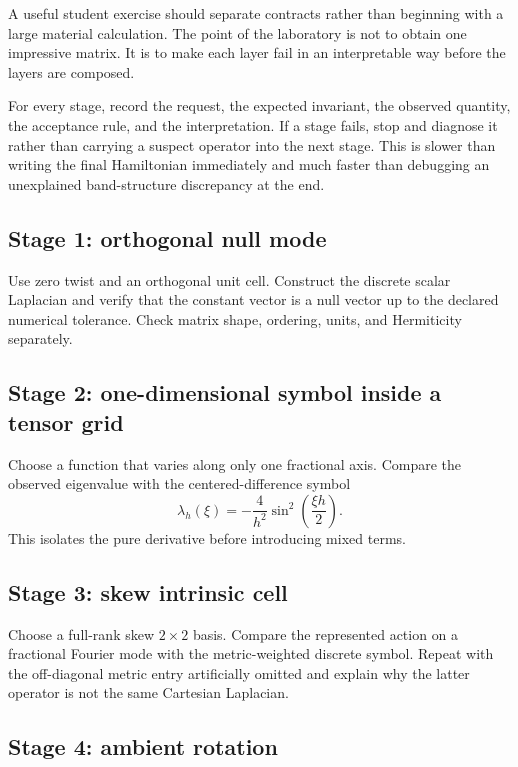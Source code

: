 A useful student exercise should separate contracts rather than beginning with
a large material calculation. The point of the laboratory is not to obtain one
impressive matrix. It is to make each layer fail in an interpretable way before
the layers are composed.

For every stage, record the request, the expected invariant, the observed
quantity, the acceptance rule, and the interpretation. If a stage fails, stop
and diagnose it rather than carrying a suspect operator into the next stage.
This is slower than writing the final Hamiltonian immediately and much faster
than debugging an unexplained band-structure discrepancy at the end.

\subsection{Stage 1: orthogonal null mode}

Use zero twist and an orthogonal unit cell. Construct the discrete scalar
Laplacian and verify that the constant vector is a null vector up to the
declared numerical tolerance. Check matrix shape, ordering, units, and
Hermiticity separately.

\subsection{Stage 2: one-dimensional symbol inside a tensor grid}

Choose a function that varies along only one fractional axis. Compare the
observed eigenvalue with the centered-difference symbol
\begin{equation}
  \lambda_h(\xi)
  =-\frac{4}{h^2}\sin^2\!\left(\frac{\xi h}{2}\right).
  \label{eq:training-centered-symbol}
\end{equation}
This isolates the pure derivative before introducing mixed terms.

\subsection{Stage 3: skew intrinsic cell}

Choose a full-rank skew $2\times2$ basis. Compare the represented action on a
fractional Fourier mode with the metric-weighted discrete symbol. Repeat with
the off-diagonal metric entry artificially omitted and explain why the latter
operator is not the same Cartesian Laplacian.

\subsection{Stage 4: ambient rotation}

